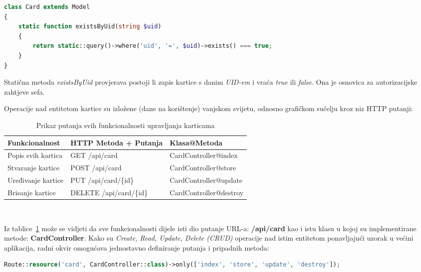 \begin{lstlisting}[language=PHP]
class Card extends Model
{
    static function existsByUid(string $uid)
    {
        return static::query()->where('uid', '=', $uid)->exists() === true;
    }
}
\end{lstlisting}

Statična metoda \textit{existsByUid} provjerava postoji li zapis kartice s danim \textit{UID-em} i vraća \textit{true} ili \textit{false}.
Ona je osnovica za autorizacijske zahtjeve sefa.

\pagebreak

Operacije nad entitetom kartice su izložene (dane na korištenje) vanjskom svijetu, odnosno grafičkom sučelju kroz niz
HTTP putanji:

\begin{table}[h!]
    \centering
    \caption{Prikaz putanja svih funkcionalnosti upravljanja karticama}
    \begin{tabularx}{\textwidth}{|X|X|X|}
        \hline
        \cellcolor{gray!25} Funkcionalnost & \cellcolor{gray!25} HTTP Metoda + Putanja & \cellcolor{gray!25} Klasa@Metoda \\
        \hline
        Popis svih kartica & GET /api/card & CardController@index \\
        \hline
        Stvaranje kartice & POST /api/card & CardController@store \\
        \hline
        Uređivanje kartice & PUT /api/card/\{id\} & CardController@update \\
        \hline
        Brisanje kartice & DELETE /api/card/\{id\} & CardController@destroy \\
        \hline
    \end{tabularx}
    \\[10pt]
    \label{tab:card_functionalities}
\end{table}

Iz tablice~\ref{tab:card_functionalities} može se vidjeti da sve funkcionalnosti dijele isti dio putanje URL-a: \textbf{/api/card}
kao i istu klasu u kojoj su implementirane metode: \textbf{CardController}.
Kako su \textit{Create, Read, Update, Delete (CRUD)} operacije nad istim entitetom ponavljajući uzorak u većini aplikacija, radni okvir omogućava
jednostavno definiranje putanja i pripadnih metoda:

\begin{lstlisting}[language=PHP]
Route::resource('card', CardController::class)->only(['index', 'store', 'update', 'destroy']);
\end{lstlisting}

